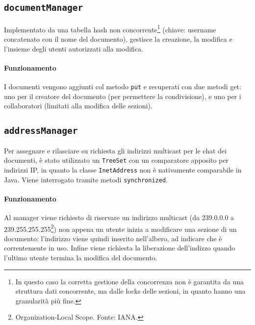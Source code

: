 \subsection{\texttt{documentManager}}
Implementato da una tabella hash non concorrente\footnote{In questo caso la corretta gestione della concorrenza non è garantita da una struttura dati concorrente, ma dalle locks delle sezioni, in quanto hanno una granularità più fine.} (chiave: username concatenato con il nome del documento), gestisce la creazione, la modifica e l'insieme degli utenti autorizzati alla modifica.

\paragraph{Funzionamento}
I documenti vengono aggiunti col metodo \texttt{put} e recuperati con due metodi get: uno per il creatore del documento (per permettere la condivisione), e uno per i collaboratori (limitati alla modifica delle sezioni).

\subsection{\texttt{addressManager}}
Per assegnare e rilasciare su richiesta gli indirizzi multicast per le chat dei documenti, è stato utilizzato un \texttt{TreeSet} con un comparatore apposito per indirizzi IP, in quanto la classe \texttt{InetAddress} non è nativamente comparabile in Java. Viene interrogato tramite metodi \texttt{synchronized}.

\paragraph{Funzionamento}
Al manager viene richiesto di riservare un indirizzo multicast (da 239.0.0.0 a 239.255.255.255\footnote{Organization-Local Scope. Fonte: IANA.}) non appena un utente inizia a modificare una sezione di un documento: l'indirizzo viene quindi inserito nell'albero, ad indicare che è correntemente in uso. Infine viene richiesta la liberazione dell'indizzo quando l'ultimo utente termina la modifica del documento.
